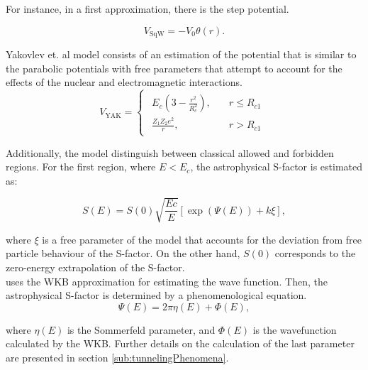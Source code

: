 \documentclass[openany]{book}
\begin{document}
 For instance, in a first approximation, there is the step potential.

\begin{equation} \label{eq:potential_squareWell}
	V_{\mathrm{SqW}} = -V_0\theta(r).
\end{equation}

Yakovlev et. al model \cite{yakovlev_beard_gasques_wiescher_2010} consists of an estimation of the potential that is similar to the parabolic potentials with free parameters that attempt to account for the effects of the nuclear and electromagnetic interactions.  \\


\begin{equation} \label{eq:potential_Yakovlev}
	V_{\mathrm{YAK}} = 	\left\{\begin{array}{l}
		\begin{split}
			E_c\left(3 - \frac{r^2}{R_c^2}\right), \quad &r \le R_{c1} \\ 
			\frac{Z_1Z_2e^2}{r}, \quad &r > R_{c1}	
		\end{split}
	\end{array}\right.
\end{equation}

Additionally, the model distinguish between classical allowed and forbidden regions.  For the first region, where $E < E_c$, the astrophysical S-factor is estimated as:

\begin{equation}  \label{eq:potential_Yakovlev_sfactor}
	S(E) = S(0)\sqrt{\frac{Ec}{E}} [\exp{(\Psi(E))+ k\xi} ],
\end{equation}

where $\xi$ is a free parameter of the model that accounts for the deviation from free particle behaviour of the S-factor. On the other hand, $S(0)$ corresponds to the zero-energy extrapolation of the S-factor. \\

uses the WKB approximation for estimating the wave function. Then, the astrophysical S-factor is determined by a phenomenological equation. \\

\begin{equation}  \label{eq:potential_Yakovlev_psiWKB}
	\Psi(E) = 2\pi\eta(E) + \Phi(E),
\end{equation}

where $\eta(E)$ is the Sommerfeld parameter, and $\Phi(E)$ is the wavefunction calculated by the WKB. Further details on the calculation of the last parameter are presented in section \ref{sub:tunnelingPhenomena}. \\
\end{document}
